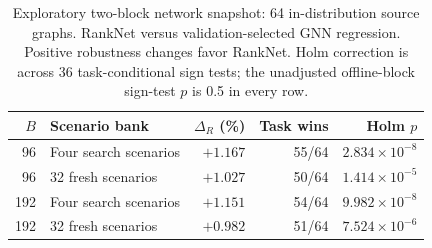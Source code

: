 \begin{table}[tb]
\centering\small
\caption{Exploratory two-block network snapshot: 64 in-distribution source graphs. RankNet versus validation-selected GNN regression. Positive robustness changes favor RankNet. Holm correction is across 36 task-conditional sign tests; the unadjusted offline-block sign-test $p$ is 0.5 in every row.}
\label{tab:networkinterim}
\begin{tabular}{rlrrr}\toprule
$B$ & Scenario bank & $\Delta_R$ (\%) & Task wins & Holm $p$\\\midrule
96 & Four search scenarios & $+1.167$ & 55/64 & $2.834\times10^{-8}$\\
96 & 32 fresh scenarios & $+1.027$ & 50/64 & $1.414\times10^{-5}$\\
192 & Four search scenarios & $+1.151$ & 54/64 & $9.982\times10^{-8}$\\
192 & 32 fresh scenarios & $+0.982$ & 51/64 & $7.524\times10^{-6}$\\
\bottomrule\end{tabular}
\end{table}

